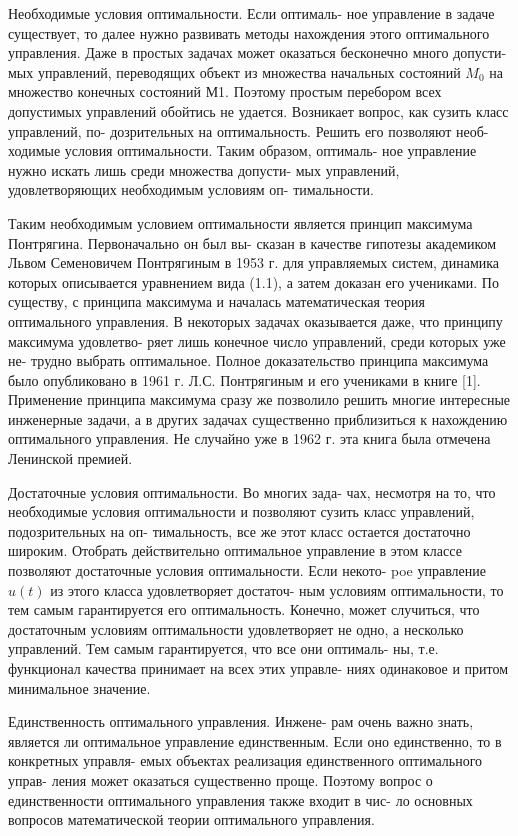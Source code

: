 \documentclass[8pt]{extarticle}
\begin{document}
Необходимые условия оптимальности. Если оптималь- ное управление в задаче существует, то далее нужно развивать методы нахождения этого оптимального управления. Даже в простых задачах может оказаться бесконечно много допусти- мых управлений, переводящих объект из множества начальных состояний \({M}_{0}\) на множество конечных состояний М1. Поэтому простым перебором всех допустимых управлений обойтись не удается. Возникает вопрос, как сузить класс управлений, по- дозрительных на оптимальность. Решить его позволяют необ- ходимые условия оптимальности. Таким образом, оптималь- ное управление нужно искать лишь среди множества допусти- мых управлений, удовлетворяющих необходимым условиям оп- тимальности.

Таким необходимым условием оптимальности является принцип максимума Понтрягина. Первоначально он был вы- сказан в качестве гипотезы академиком Львом Семеновичем Понтрягиным в 1953 г. для управляемых систем, динамика которых описывается уравнением вида (1.1), а затем доказан его учениками. По существу, с принципа максимума и началась математическая теория оптимального управления. В некоторых задачах оказывается даже, что принципу максимума удовлетво- ряет лишь конечное число управлений, среди которых уже не- трудно выбрать оптимальное. Полное доказательство принципа максимума было опубликовано в 1961 г. Л.С. Понтрягиным и его учениками в книге [1]. Применение принципа максимума сразу же позволило решить многие интересные инженерные задачи, а в других задачах существенно приблизиться к нахождению оптимального управления. Не случайно уже в 1962 г. эта книга была отмечена Ленинской премией.

Достаточные условия оптимальности. Во многих зада- чах, несмотря на то, что необходимые условия оптимальности и позволяют сузить класс управлений, подозрительных на оп- тимальность, все же этот класс остается достаточно широким. Отобрать действительно оптимальное управление в этом классе позволяют достаточные условия оптимальности. Если некото- poe управление \(u\left( t\right)\) из этого класса удовлетворяет достаточ- ным условиям оптимальности, то тем самым гарантируется его оптимальность. Конечно, может случиться, что достаточным условиям оптимальности удовлетворяет не одно, а несколько управлений. Тем самым гарантируется, что все они оптималь- ны, т.е. функционал качества принимает на всех этих управле- ниях одинаковое и притом минимальное значение.

Единственность оптимального управления. Инжене- рам очень важно знать, является ли оптимальное управление единственным. Если оно единственно, то в конкретных управля- емых объектах реализация единственного оптимального управ- ления может оказаться существенно проще. Поэтому вопрос о единственности оптимального управления также входит в чис- ло основных вопросов математической теории оптимального управления.
\end{document}

